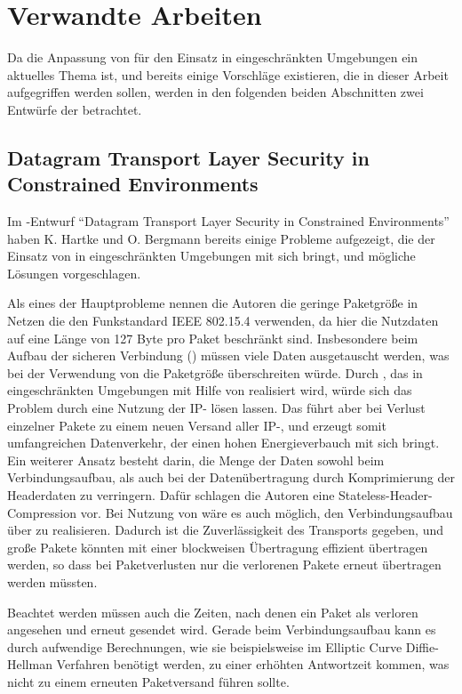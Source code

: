 \section{Verwandte Arbeiten}

Da die Anpassung von  für den Einsatz in eingeschränkten Umgebungen ein aktuelles Thema ist, und bereits einige Vorschläge
existieren, die in dieser Arbeit aufgegriffen werden sollen, werden in den folgenden beiden Abschnitten zwei Entwürfe der  betrachtet.

\subsection{Datagram Transport Layer Security in Constrained Environments}
Im -Entwurf "`Datagram Transport Layer Security in Constrained Environments"' \cite{draftcodtls} haben K. Hartke und O. Bergmann
bereits einige Probleme aufgezeigt, die der Einsatz von  in eingeschränkten Umgebungen mit sich bringt, und mögliche Lösungen vorgeschlagen.

Als eines der Hauptprobleme nennen die Autoren die geringe Paketgröße in Netzen die den Funkstandard IEEE 802.15.4 \cite{ieee802154} verwenden,
da hier die Nutzdaten auf eine Länge von 127 Byte pro Paket beschränkt sind. Insbesondere beim Aufbau der sicheren Verbindung () müssen
viele Daten ausgetauscht werden, was bei der Verwendung von  die Paketgröße überschreiten würde. Durch  \cite{rfc2460}, das in
eingeschränkten Umgebungen mit Hilfe von  \cite{rfc4944} realisiert wird, würde sich das Problem durch eine Nutzung der IP-
lösen lassen. Das führt aber bei Verlust einzelner Pakete zu einem neuen Versand aller IP-, und erzeugt somit umfangreichen Datenverkehr,
der einen hohen Energieverbauch mit sich bringt. Ein weiterer Ansatz besteht darin, die Menge der Daten sowohl beim Verbindungsaufbau, als auch bei der
Datenübertragung durch Komprimierung der Headerdaten zu verringern. Dafür schlagen die Autoren eine Stateless-Header-Compression vor. Bei Nutzung von
 wäre es auch möglich, den Verbindungsaufbau über  zu realisieren. Dadurch ist die Zuverlässigkeit des Transports gegeben, und große Pakete
könnten mit einer blockweisen Übertragung effizient übertragen werden, so dass bei Paketverlusten nur die verlorenen Pakete erneut übertragen werden müssten.

Beachtet werden müssen auch die Zeiten, nach denen ein Paket als verloren angesehen und erneut gesendet wird. Gerade beim Verbindungsaufbau
kann es durch aufwendige Berechnungen, wie sie beispielsweise im Elliptic Curve Diffie-Hellman Verfahren benötigt werden, zu einer erhöhten
Antwortzeit kommen, was nicht zu einem erneuten Paketversand führen sollte.

